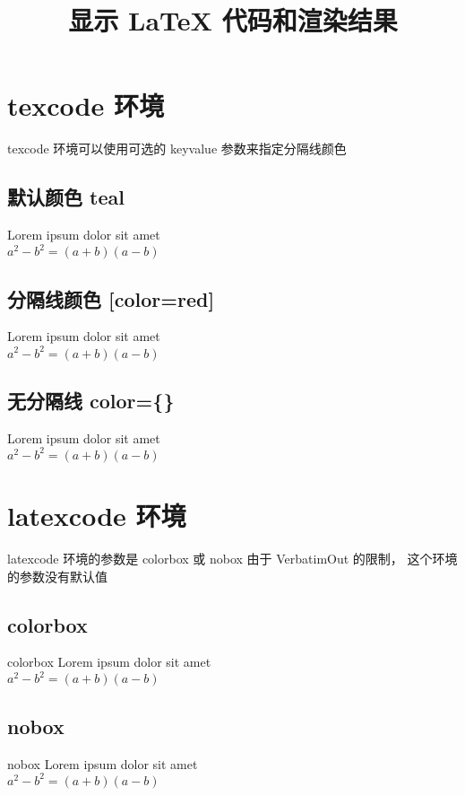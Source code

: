 \documentclass{ctexart}
\title{显示 {\LaTeX} 代码和渲染结果}
\begin{document}
\maketitle

\section{ texcode 环境 }

texcode 环境可以使用可选的 key\-value 参数来指定分隔线颜色

\subsection{默认颜色 teal}

\begin{texcode}
Lorem ipsum dolor sit amet\\
$a^2 - b^2 = (a+b)(a-b)$ 
\end{texcode}

\subsection{分隔线颜色 [color=red]}

\begin{texcode}[color=red]
Lorem ipsum dolor sit amet\\
$a^2 - b^2 = (a+b)(a-b)$ 
\end{texcode}

\subsection{无分隔线 color=\{\}}

\begin{texcode}[color={}]
Lorem ipsum dolor sit amet\\
$a^2 - b^2 = (a+b)(a-b)$ 
\end{texcode}

\section{ latexcode 环境 }

latexcode 环境的参数是 colorbox 或 nobox 
由于 VerbatimOut 的限制， 这个环境的参数没有默认值

\subsection{colorbox}

\begin{latexcode}{colorbox}
Lorem ipsum dolor sit amet\\
$a^2 - b^2 = (a+b)(a-b)$ 
\end{latexcode}

\subsection{nobox}

\begin{latexcode}{nobox}
Lorem ipsum dolor sit amet\\
$a^2 - b^2 = (a+b)(a-b)$ 
\end{latexcode}
\end{document}
